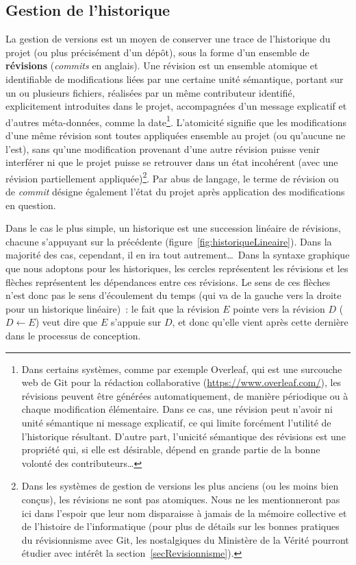 \subsection{Gestion de l'historique}

La gestion de versions est un moyen de conserver une trace de
l'historique du projet (ou plus précisément d'un dépôt), sous la forme
d'un ensemble de \textbf{révisions}
(\textit{commits} en anglais). Une révision est un ensemble atomique
et identifiable de modifications liées par une certaine unité
sémantique, portant sur un ou plusieurs fichiers, réalisées par un
même contributeur identifié, explicitement introduites dans le projet,
accompagnées d'un message explicatif et d'autres méta-données, comme
la date\footnote{Dans certains systèmes, comme par exemple
  Overleaf, qui est une surcouche web de Git pour la
  rédaction collaborative (\url{https://www.overleaf.com/}), les
  révisions peuvent être générées automatiquement, de manière
  périodique ou à chaque modification élémentaire. Dans ce cas, une
  révision peut n'avoir ni unité sémantique ni message explicatif, ce
  qui limite forcément l'utilité de l'historique résultant. D'autre
  part, l'unicité sémantique des révisions est une propriété qui, si
  elle est désirable, dépend en grande partie de la bonne volonté des
  contributeurs\ldots}. L'atomicité signifie que les modifications
d'une même révision sont toutes appliquées ensemble au projet (ou
qu'aucune ne l'est), sans qu'une modification provenant d'une autre
révision puisse venir interférer ni que le projet puisse se retrouver
dans un état incohérent (avec une révision partiellement
appliquée)\footnote{Dans les systèmes de gestion de versions les plus
  anciens (ou les moins bien conçus), les révisions ne sont pas
  atomiques. Nous ne les mentionneront pas ici dans l'espoir que leur
  nom disparaisse à jamais de la mémoire collective et de l'histoire
  de l'informatique (pour plus de détails sur les bonnes pratiques du
  révisionnisme avec Git, les nostalgiques du Ministère de la Vérité
  \cite{Orwell} pourront étudier avec intérêt la
  section~\ref{secRevisionnisme}).}.  Par abus de langage, le terme de
révision ou de \textit{commit} désigne également l'état du projet
après application des modifications en question.

Dans le cas le plus simple, un historique est une succession linéaire
de révisions, chacune s'appuyant sur la précédente
(figure~\ref{fig:historiqueLineaire}). Dans la majorité des cas,
cependant, il en ira tout autrement\ldots\ Dans la syntaxe graphique
que nous adoptons pour les historiques, les cercles représentent les
révisions et les flèches représentent les dépendances entre
ces révisions. Le sens de ces flèches n'est donc pas le sens d'écoulement
du temps (qui va de la gauche vers la droite pour un historique
linéaire)~: le fait que la révision $E$ pointe vers la révision $D$
($D \leftarrow E$) veut dire que $E$ s'appuie sur $D$, et donc qu'elle
vient après cette dernière dans le processus de conception.

